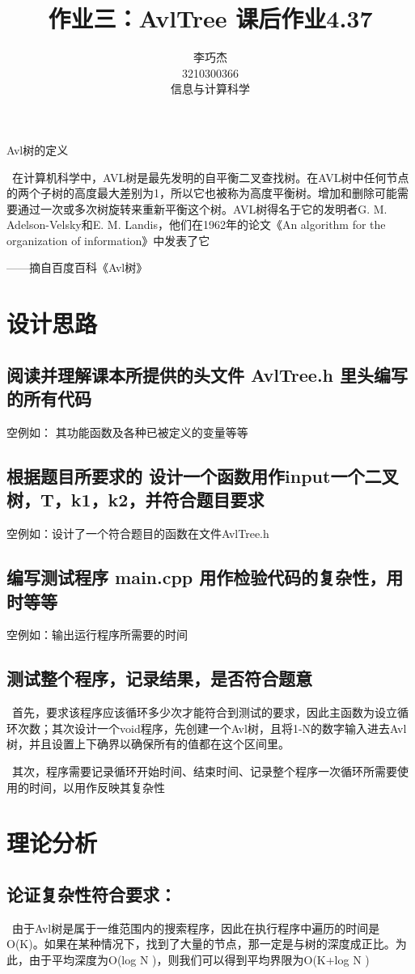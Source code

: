 \documentclass[UTF8]{ctexart}
\title{作业三：AvlTree 课后作业4.37}
\author{李巧杰 \\ 3210300366 \\ 信息与计算科学}
\begin{document}
\maketitle

\begin{center}
Avl树的定义
\end{center}

\   在计算机科学中，AVL树是最先发明的自平衡二叉查找树。在AVL树中任何节点的两个子树的高度最大差别为1，所以它也被称为高度平衡树。增加和删除可能需要通过一次或多次树旋转来重新平衡这个树。AVL树得名于它的发明者G. M. Adelson-Velsky和E. M. Landis，他们在1962年的论文《An algorithm for the organization of information》中发表了它

\begin{flushright}
——摘自百度百科《Avl树》
\end{flushright}

\section{设计思路}

\subsection{阅读并理解课本所提供的头文件 AvlTree.h 里头编写的所有代码}
\hphantom 空例如： 其功能函数及各种已被定义的变量等等

\subsection{根据题目所要求的 设计一个函数用作input一个二叉树，T，k1，k2，并符合题目要求}
\hphantom 空例如：设计了一个符合题目的函数在文件AvlTree.h

\subsection{编写测试程序 main.cpp 用作检验代码的复杂性，用时等等}
\hphantom 空例如：输出运行程序所需要的时间

\subsection{测试整个程序，记录结果，是否符合题意}

\   首先，要求该程序应该循环多少次才能符合到测试的要求，因此主函数为设立循环次数；其次设计一个void程序，先创建一个Avl树，且将1-N的数字输入进去Avl树，并且设置上下确界以确保所有的值都在这个区间里。

\   其次，程序需要记录循环开始时间、结束时间、记录整个程序一次循环所需要使用的时间，以用作反映其复杂性

\newpage

\section{理论分析}

\subsection{论证复杂性符合要求：}

\   由于Avl树是属于一维范围内的搜索程序，因此在执行程序中遍历的时间是 O(K)。如果在某种情况下，找到了大量的节点，那一定是与树的深度成正比。为此，由于平均深度为O(log N )，则我们可以得到平均界限为O(K+log N )
\end{document}
